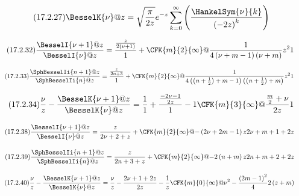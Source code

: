 \documentclass[11pt]{article}
\begin{document}
\begin{equation*}\tag{17.2.27}
  \BesselK{\nu}@{z}
  = \sqrt{\frac{\pi}{2z}}e^{-z} \sum_{k=0}^\infty \left(\frac{\HankelSym{\nu}{k}}{\left(-2z\right)^{k}}\right)
\end{equation*}

\begin{equation*}\tag{17.2.32}
  \frac{\BesselI{\nu+1}@{z}}{\BesselI{\nu}@{z}}
  = \frac{\frac{z}{2\left(\nu+1\right)}}{1}+\CFK{m}{2}{\infty}@{\frac{1}{4\left(\nu+m-1\right)\left(\nu+m\right)}z^{2}}{1}
\end{equation*}

\begin{equation*}\tag{17.2.33}
  \frac{\SphBesselIi{n+1}@{z}}{\SphBesselIi{n}@{z}}
  = \frac{\frac{z}{2n+3}}{1}+\CFK{m}{2}{\infty}@{\frac{1}{4\left(\left(n+\frac{1}{2}\right)+m-1\right)\left(\left(n+\frac{1}{2}\right)+m\right)}z^{2}}{1}
\end{equation*}

\begin{equation*}\tag{17.2.34}
  \frac{\nu}{z}-\frac{\BesselK{\nu+1}@{z}}{\BesselK{\nu}@{z}}
  = \frac{1}{1}+\frac{\frac{-2\nu-1}{2z}}{1}-1 \CFK{m}{3}{\infty}@{\frac{\frac{m}{2}+\nu}{2z}}{1}
\end{equation*}

\begin{equation*}\tag{17.2.38}
  \frac{\BesselI{\nu+1}@{z}}{\BesselI{\nu}@{z}}
  = \frac{z}{2\nu+2+z}+\CFK{m}{2}{\infty}@{-\left(2\nu+2m-1\right)z}{2\nu+m+1+2z}
\end{equation*}

\begin{equation*}\tag{17.2.39}
  \frac{\SphBesselIi{n+1}@{z}}{\SphBesselIi{n}@{z}}
  = \frac{z}{2n+3+z}+\CFK{m}{2}{\infty}@{-2\left(n+m\right)z}{2n+m+2+2z}
\end{equation*}

\begin{equation*}\tag{17.2.40}
  \frac{\nu}{z}-\frac{\BesselK{\nu+1}@{z}}{\BesselK{\nu}@{z}}
  = \frac{\nu}{z}-\frac{2\nu+1+2z}{2z}-\frac{1}{z} \CFK{m}{0}{\infty}@{\nu^{2}-\frac{\left(2m-1\right)^{2}}{4}}{2\left(z+m\right)}
\end{equation*}
\end{document}

